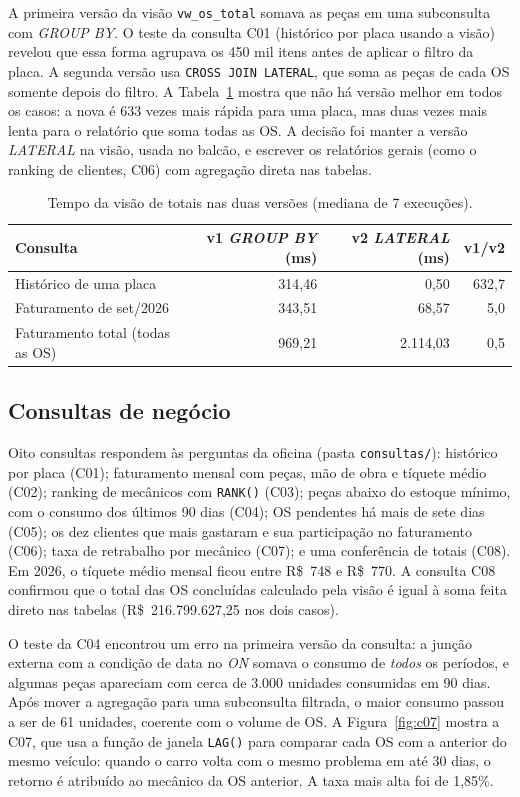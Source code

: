 \documentclass[a4paper,12pt]{article}
\newcommand{\cod}[1]{\texttt{\small #1}}
\begin{document}
A primeira versão da visão \cod{vw\_os\_total} somava as peças em uma
subconsulta com \emph{GROUP BY}. O teste da consulta C01 (histórico por
placa usando a visão) revelou que essa forma agrupava os 450 mil itens
antes de aplicar o filtro da placa. A segunda versão usa
\cod{CROSS JOIN LATERAL}, que soma as peças de cada OS somente depois
do filtro. A Tabela~\ref{tab:view} mostra que não há versão melhor em
todos os casos: a nova é 633 vezes mais rápida para uma placa, mas duas
vezes mais lenta para o relatório que soma todas as OS. A decisão foi
manter a versão \emph{LATERAL} na visão, usada no balcão, e escrever os
relatórios gerais (como o ranking de clientes, C06) com agregação direta
nas tabelas.

\begin{table}[!htbp]
  \centering
  \caption{Tempo da visão de totais nas duas versões (mediana de 7 execuções).}
  \label{tab:view}
  \footnotesize
  \begin{tabular}{lrrr}
    \hline
    Consulta & v1 \emph{GROUP BY} (ms) & v2 \emph{LATERAL} (ms) & v1/v2 \\ \hline
    Histórico de uma placa & 314,46 & 0,50 & 632,7 \\
    Faturamento de set/2026 & 343,51 & 68,57 & 5,0 \\
    Faturamento total (todas as OS) & 969,21 & 2.114,03 & 0,5 \\ \hline
  \end{tabular}
\end{table}

\subsection{Consultas de negócio}

Oito consultas respondem às perguntas da oficina (pasta
\cod{consultas/}): histórico por placa (C01); faturamento mensal com
peças, mão de obra e tíquete médio (C02); ranking de mecânicos com
\cod{RANK()} (C03); peças abaixo do estoque mínimo, com o consumo dos
últimos 90 dias (C04); OS pendentes há mais de sete dias (C05); os dez
clientes que mais gastaram e sua participação no faturamento (C06);
taxa de retrabalho por mecânico (C07); e uma conferência de totais
(C08). Em 2026, o tíquete médio mensal ficou entre R\$~748 e R\$~770.
A consulta C08 confirmou que o total das OS concluídas calculado pela
visão é igual à soma feita direto nas tabelas (R\$~216.799.627,25 nos
dois casos).

O teste da C04 encontrou um erro na primeira versão da consulta: a
junção externa com a condição de data no \emph{ON} somava o consumo de
\emph{todos} os períodos, e algumas peças apareciam com cerca de 3.000
unidades consumidas em 90 dias. Após mover a agregação para uma
subconsulta filtrada, o maior consumo passou a ser de 61 unidades,
coerente com o volume de OS. A Figura~\ref{fig:c07} mostra a C07, que usa
a função de janela \cod{LAG()} para comparar cada OS com a anterior do
mesmo veículo: quando o carro volta com o mesmo problema em até 30 dias,
o retorno é atribuído ao mecânico da OS anterior. A taxa mais alta foi
de 1,85\%.
\end{document}
